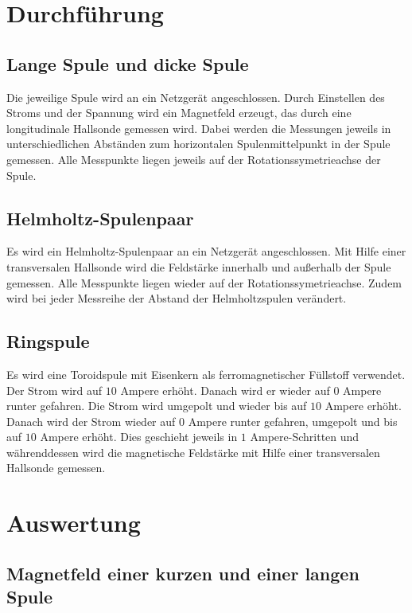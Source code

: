 \documentclass[
  bibliography=totoc,     %
  captions=tableheading,  %
  titlepage=firstiscover, %
]{scrartcl}
\begin{document}
  \newpage
  \section{Durchführung}
  \label{sec:Durchführung}

  \subsection{Lange Spule und dicke Spule}
  \label{sec:langeSpule}
  Die jeweilige Spule wird an ein Netzgerät angeschlossen. Durch Einstellen des Stroms und der Spannung
  wird ein Magnetfeld erzeugt, das durch eine longitudinale Hallsonde gemessen wird. Dabei werden die Messungen jeweils
  in unterschiedlichen Abständen zum horizontalen Spulenmittelpunkt in der Spule gemessen. Alle Messpunkte liegen jeweils auf
  der Rotationssymetrieachse der Spule.

  \subsection{Helmholtz-Spulenpaar}
  \label{sec:helmholtz}
  Es wird ein Helmholtz-Spulenpaar an ein Netzgerät angeschlossen. Mit Hilfe einer transversalen Hallsonde
  wird die Feldstärke innerhalb und außerhalb der Spule gemessen. Alle Messpunkte liegen wieder auf der Rotationssymetrieachse.
  Zudem wird bei jeder Messreihe der Abstand der Helmholtzspulen verändert.

  \subsection{Ringspule}
  \label{sec:ringspule}
  Es wird eine Toroidspule mit Eisenkern als ferromagnetischer Füllstoff verwendet. Der Strom wird
  auf $10$ Ampere erhöht. Danach wird er wieder auf $0$ Ampere runter gefahren. Die Strom wird umgepolt
  und wieder bis auf $10$ Ampere erhöht. Danach wird der Strom wieder auf $0$ Ampere runter gefahren, umgepolt
  und bis auf $10$ Ampere erhöht. Dies geschieht jeweils in $1$ Ampere-Schritten und währenddessen wird die
  magnetische Feldstärke mit Hilfe einer transversalen Hallsonde gemessen.

  \newpage
  \section{Auswertung}
  \label{sec:Auswertung}
  
  \subsection{Magnetfeld einer kurzen und einer langen Spule}
\end{document}
